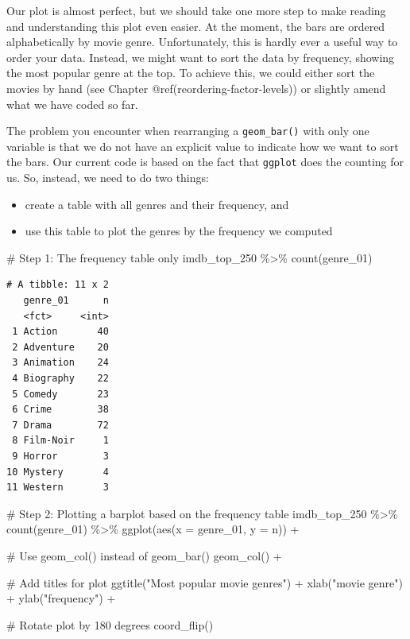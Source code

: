 \documentclass[
  letterpaper,
]{krantz}
\makeatletter
\newenvironment{Shaded}{\begin{snugshade}}{\end{snugshade}}
\newcommand{\AttributeTok}[1]{\textcolor[rgb]{0.40,0.45,0.13}{#1}}
\newcommand{\CommentTok}[1]{\textcolor[rgb]{0.37,0.37,0.37}{#1}}
\newcommand{\FunctionTok}[1]{\textcolor[rgb]{0.28,0.35,0.67}{#1}}
\newcommand{\NormalTok}[1]{\textcolor[rgb]{0.00,0.23,0.31}{#1}}
\newcommand{\SpecialCharTok}[1]{\textcolor[rgb]{0.37,0.37,0.37}{#1}}
\newcommand{\StringTok}[1]{\textcolor[rgb]{0.13,0.47,0.30}{#1}}
\newenvironment{kframe}{%
\medskip{}
\setlength{\fboxsep}{.8em}
 \def\at@end@of@kframe{}%
 \ifinner\ifhmode%
  \def\at@end@of@kframe{\end{minipage}}%
  \begin{minipage}{\columnwidth}%
 \fi\fi%
 \def\FrameCommand##1{\hskip\@totalleftmargin \hskip-\fboxsep
 \colorbox{shadecolor}{##1}\hskip-\fboxsep
     \hskip-\linewidth \hskip-\@totalleftmargin \hskip\columnwidth}%
 \MakeFramed {\advance\hsize-\width
   \@totalleftmargin\z@ \linewidth\hsize
   \@setminipage}}%
 {\par\unskip\endMakeFramed%
 \at@end@of@kframe}
\renewenvironment{Shaded}{\begin{kframe}}{\end{kframe}}
\makeatother
\begin{document}
Our plot is almost perfect, but we should take one more step to make
reading and understanding this plot even easier. At the moment, the bars
are ordered alphabetically by movie genre. Unfortunately, this is hardly
ever a useful way to order your data. Instead, we might want to sort the
data by frequency, showing the most popular genre at the top. To achieve
this, we could either sort the movies by hand (see Chapter
@ref(reordering-factor-levels)) or slightly amend what we have coded so
far.

The problem you encounter when rearranging a \texttt{geom\_bar()} with
only one variable is that we do not have an explicit value to indicate
how we want to sort the bars. Our current code is based on the fact that
\texttt{ggplot} does the counting for us. So, instead, we need to do two
things:

\begin{itemize}
\item
  create a table with all genres and their frequency, and
\item
  use this table to plot the genres by the frequency we computed
\end{itemize}

\begin{Shaded}
\begin{Highlighting}[]
\CommentTok{\# Step 1: The frequency table only}
\NormalTok{imdb\_top\_250 }\SpecialCharTok{\%\textgreater{}\%}
  \FunctionTok{count}\NormalTok{(genre\_01)}
\end{Highlighting}
\end{Shaded}

\begin{verbatim}
# A tibble: 11 x 2
   genre_01      n
   <fct>     <int>
 1 Action       40
 2 Adventure    20
 3 Animation    24
 4 Biography    22
 5 Comedy       23
 6 Crime        38
 7 Drama        72
 8 Film-Noir     1
 9 Horror        3
10 Mystery       4
11 Western       3
\end{verbatim}

\begin{Shaded}
\begin{Highlighting}[]
\CommentTok{\# Step 2: Plotting a barplot based on the frequency table}
\NormalTok{imdb\_top\_250 }\SpecialCharTok{\%\textgreater{}\%}
  \FunctionTok{count}\NormalTok{(genre\_01) }\SpecialCharTok{\%\textgreater{}\%}
  \FunctionTok{ggplot}\NormalTok{(}\FunctionTok{aes}\NormalTok{(}\AttributeTok{x =}\NormalTok{ genre\_01, }\AttributeTok{y =}\NormalTok{ n)) }\SpecialCharTok{+}

  \CommentTok{\# Use geom\_col() instead of geom\_bar()}
  \FunctionTok{geom\_col}\NormalTok{() }\SpecialCharTok{+}
  
  \CommentTok{\# Add titles for plot}
  \FunctionTok{ggtitle}\NormalTok{(}\StringTok{"Most popular movie genres"}\NormalTok{) }\SpecialCharTok{+}
  \FunctionTok{xlab}\NormalTok{(}\StringTok{"movie genre"}\NormalTok{) }\SpecialCharTok{+}
  \FunctionTok{ylab}\NormalTok{(}\StringTok{"frequency"}\NormalTok{) }\SpecialCharTok{+}
  
  \CommentTok{\# Rotate plot by 180 degrees}
  \FunctionTok{coord\_flip}\NormalTok{()}
\end{Highlighting}
\end{Shaded}
\end{document}
